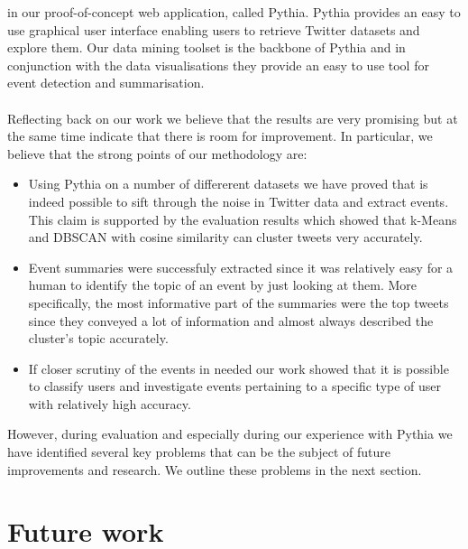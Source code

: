 in our proof-of-concept web application, called Pythia. Pythia provides an easy to use graphical user interface enabling users to retrieve Twitter datasets and explore them. Our data mining 
toolset is the backbone of Pythia and in conjunction with the data visualisations they provide an easy to use tool for event detection and summarisation.\\\\
Reflecting back on our work we believe that the results are very promising but at the same time indicate that there is room for improvement. In particular, we believe that the strong points of our methodology are:
\begin{itemize}
  \item Using Pythia on a number of differerent datasets we have proved that is indeed possible to sift through the noise in Twitter data and extract events. This claim is supported by the evaluation results which showed that k-Means and DBSCAN with cosine similarity can cluster tweets very accurately.
  \item Event summaries were successfuly extracted since it was relatively easy for a human to identify the topic of an event by just looking at them. More specifically, the most informative part of the summaries were the top tweets since they conveyed a lot of information and almost always described the cluster's topic accurately. 
  \item If closer scrutiny of the events in needed our work showed that it is possible to classify users and investigate events pertaining to a specific type of user with relatively high accuracy.
\end{itemize}\vspace{15pt}
However, during evaluation and especially during our experience with Pythia we have identified several key problems that can be the subject of future improvements and research. We outline these problems in the next section. 

\section{Future work}

